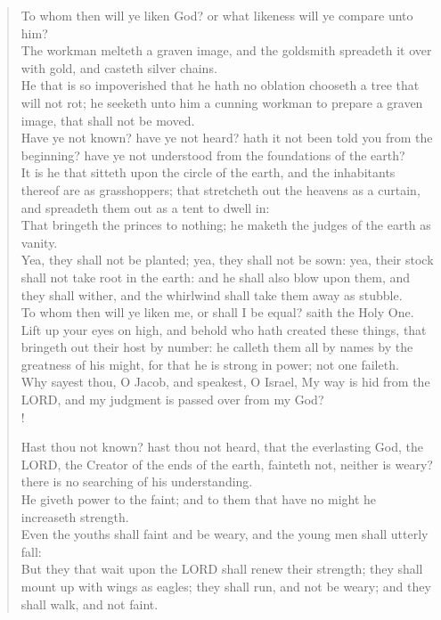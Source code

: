 \documentclass[MAIN]{subfiles}
\begin{document}
\begin{verse}
To whom then will ye liken God? or what likeness will ye compare unto him?\\
The workman melteth a graven image, and the goldsmith spreadeth it over with gold, and casteth silver chains.\\
He that is so impoverished that he hath no oblation chooseth a tree that will not rot; he seeketh unto him a cunning workman to prepare a graven image, that shall not be moved.\\
Have ye not known? have ye not heard? hath it not been told you from the beginning? have ye not understood from the foundations of the earth?\\
It is he that sitteth upon the circle of the earth, and the inhabitants thereof are as grasshoppers; that stretcheth out the heavens as a curtain, and spreadeth them out as a tent to dwell in:\\
That bringeth the princes to nothing; he maketh the judges of the earth as vanity.\\
Yea, they shall not be planted; yea, they shall not be sown: yea, their stock shall not take root in the earth: and he shall also blow upon them, and they shall wither, and the whirlwind shall take them away as stubble.\\
To whom then will ye liken me, or shall I be equal? saith the Holy One.\\
Lift up your eyes on high, and behold who hath created these things, that bringeth out their host by number: he calleth them all by names by the greatness of his might, for that he is strong in power; not one faileth.\\
Why sayest thou, O Jacob, and speakest, O Israel, My way is hid from the {\hge LORD}, and my judgment is passed over from my God?\\!

Hast thou not known? hast thou not heard, that the everlasting God, the {\hge LORD}, the Creator of the ends of the earth, fainteth not, neither is weary? there is no searching of his understanding.\\
He giveth power to the faint; and to them that have no might he increaseth strength.\\
Even the youths shall faint and be weary, and the young men shall utterly fall:\\
But they that wait upon the {\hge LORD} shall renew their strength; they shall mount up with wings as eagles; they shall run, and not be weary; and they shall walk, and not faint.
\end{verse}
\end{document}
